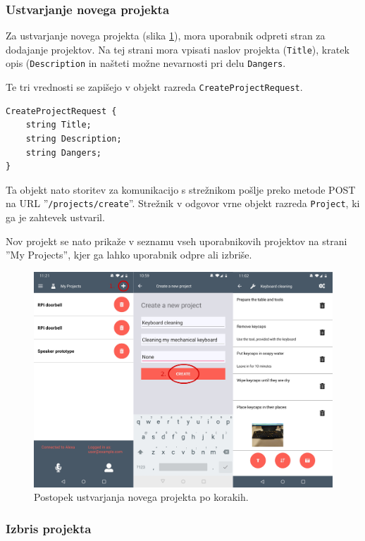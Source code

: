\documentclass[a4paper, 12pt]{book}
\begin{document}
\subsubsection{Ustvarjanje novega projekta}

Za ustvarjanje novega projekta (slika \ref{app_newproject}), mora uporabnik odpreti stran za dodajanje projektov.
Na tej strani mora vpisati naslov projekta (\texttt{Title}), kratek opis (\texttt{Description} in našteti možne nevarnosti pri delu \texttt{Dangers}.

Te tri vrednosti se zapišejo v objekt razreda \texttt{CreateProjectRequest}.
\begin{Verbatim}[commandchars=+\[\]]
CreateProjectRequest {
    string Title;
    string Description;
    string Dangers;
}
\end{Verbatim}

Ta objekt nato storitev za komunikacijo s strežnikom pošlje preko metode POST na URL ''\texttt{/projects/create}''.
Strežnik v odgovor vrne objekt razreda \texttt{Project}, ki ga je zahtevek ustvaril.

Nov projekt se nato prikaže v seznamu vseh uporabnikovih projektov na strani ''My Projects'', kjer ga lahko uporabnik odpre ali izbriše.

\begin{figure}[H]
\begin{center}
\includegraphics[width=13cm]{app_newproject}
\end{center}
	\caption{Postopek ustvarjanja novega projekta po korakih.}
\label{app_newproject}
\end{figure}

\subsubsection{Izbris projekta}
\end{document}
